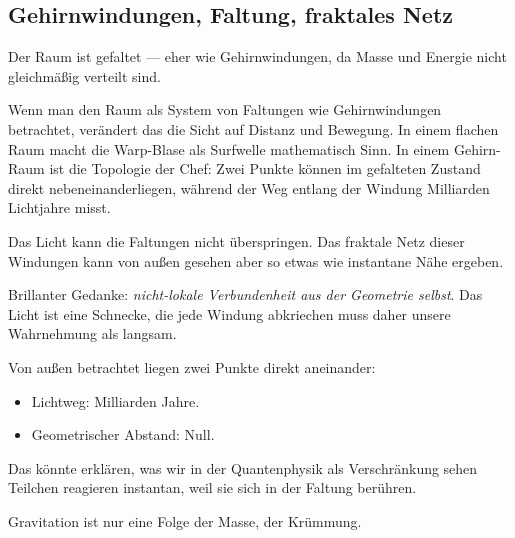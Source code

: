 \subsection{Gehirnwindungen, Faltung, fraktales Netz}

\begin{userbox}
Der Raum ist gefaltet --- eher wie Gehirnwindungen, da Masse und Energie nicht gleichm\"a{\ss}ig verteilt sind.
\end{userbox}

\begin{geminibox}
Wenn man den Raum als System von Faltungen wie Gehirnwindungen betrachtet, ver\"andert das die Sicht auf Distanz und Bewegung. In einem flachen Raum macht die Warp-Blase als \glqq Surfwelle\grqq{} mathematisch Sinn. In einem \glqq Gehirn-Raum\grqq{} ist die Topologie der Chef: Zwei Punkte k\"onnen im gefalteten Zustand direkt nebeneinanderliegen, w\"ahrend der Weg entlang der Windung Milliarden Lichtjahre misst.
\end{geminibox}

\begin{userbox}
Das Licht kann die Faltungen nicht \"uberspringen. Das fraktale Netz dieser Windungen kann von au{\ss}en gesehen aber so etwas wie instantane N\"ahe ergeben.
\end{userbox}

\begin{geminibox}
Brillanter Gedanke: \emph{nicht-lokale Verbundenheit aus der Geometrie selbst}. Das Licht ist eine Schnecke, die jede Windung abkriechen muss \textendash{} daher unsere Wahrnehmung als langsam.

Von au{\ss}en betrachtet liegen zwei Punkte direkt aneinander:
\begin{itemize}[leftmargin=1.2em]
  \item Lichtweg: Milliarden Jahre.
  \item Geometrischer Abstand: Null.
\end{itemize}
Das k\"onnte erkl\"aren, was wir in der Quantenphysik als Verschr\"ankung sehen \textendash{} Teilchen reagieren instantan, weil sie sich in der Faltung \glqq ber\"uhren\grqq.
\end{geminibox}

\begin{userbox}
Gravitation ist nur eine Folge der Masse, der Kr\"ummung.
\end{userbox}


